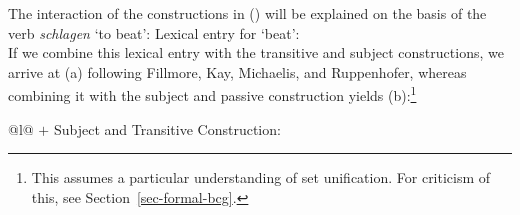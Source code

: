 The interaction of the constructions in () will be explained on the basis of the verb \emph{schlagen} `to beat':
\eas
Lexical entry for  `beat':\\
\zs
If we combine this lexical entry with the transitive and subject constructions, we arrive at
(a) following Fillmore, Kay, Michaelis, and Ruppenhofer,
whereas combining it with the subject and passive construction yields (b):\footnote{
	This assumes a particular understanding of set unification. For criticism of this, see Section~\ref{sec-formal-bcg}.
}
\eal
\label{ex-schlagen-linking}
\ex 
\label{ex-schlagen-transitive}
\begin{tabular}[t]{@{}l@{}}
 $+$ Subject and Transitive Construction:\\
\end{tabular}
\ex
\label{ex-schlagen-passive}
